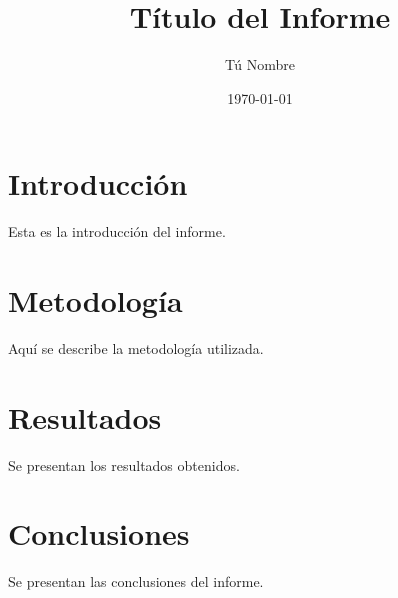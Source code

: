 \documentclass{formato/reportuach}
\title{Título del Informe}
\author{Tú Nombre}
\institute{Universidad XYZ}
\date{\today}
\begin{document}
\maketitle

\section{Introducción}
Esta es la introducción del informe.

\section{Metodología}
Aquí se describe la metodología utilizada.

\section{Resultados}
Se presentan los resultados obtenidos.

\section{Conclusiones}
Se presentan las conclusiones del informe.
\end{document}
